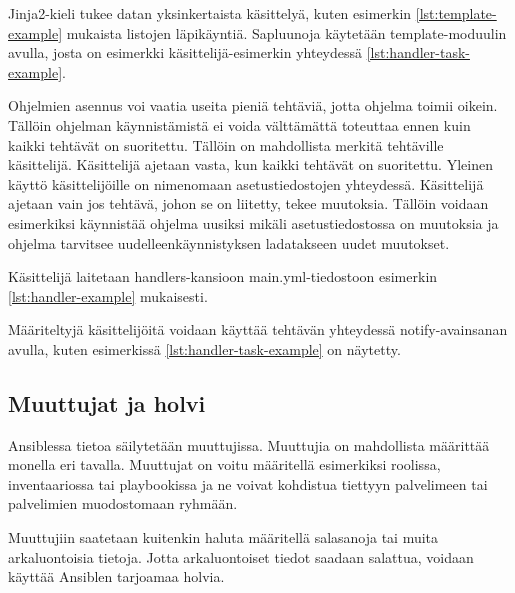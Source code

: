 

Jinja2-kieli tukee datan yksinkertaista käsittelyä, kuten esimerkin
\ref{lst:template-example} mukaista listojen läpikäyntiä. Sapluunoja
käytetään template-moduulin avulla, josta on esimerkki käsittelijä-esimerkin
yhteydessä \ref{lst:handler-task-example}. \parencite{AnsibleDocs}

Ohjelmien asennus voi vaatia useita pieniä tehtäviä, jotta ohjelma toimii
oikein. Tällöin ohjelman käynnistämistä ei voida välttämättä toteuttaa ennen
kuin kaikki tehtävät on suoritettu. Tällöin on mahdollista merkitä tehtäville
käsittelijä. Käsittelijä ajetaan vasta, kun kaikki tehtävät on suoritettu.
Yleinen käyttö käsittelijöille  on nimenomaan asetustiedostojen yhteydessä.
Käsittelijä ajetaan vain jos tehtävä, johon se on liitetty, tekee muutoksia.
Tällöin voidaan esimerkiksi käynnistää ohjelma uusiksi mikäli asetustiedostossa
on muutoksia ja ohjelma tarvitsee uudelleenkäynnistyksen ladatakseen uudet
muutokset. \parencite{JamesFreeman2020PA2}

Käsittelijä laitetaan handlers-kansioon main.yml-tiedostoon esimerkin
\ref{lst:handler-example} mukaisesti.



Määriteltyjä käsittelijöitä voidaan käyttää tehtävän yhteydessä notify-avainsanan
avulla, kuten esimerkissä \ref{lst:handler-task-example} on näytetty.



\subsection{Muuttujat ja holvi}

Ansiblessa tietoa säilytetään muuttujissa. Muuttujia on mahdollista määrittää monella
eri tavalla. Muuttujat on voitu määritellä esimerkiksi roolissa, inventaariossa
tai playbookissa ja ne voivat kohdistua tiettyyn palvelimeen tai palvelimien
muodostomaan ryhmään. \parencite{JamesFreeman2020PA2}

Muuttujiin saatetaan kuitenkin haluta määritellä salasanoja tai muita arkaluontoisia
tietoja. Jotta arkaluontoiset tiedot saadaan salattua, voidaan käyttää Ansiblen
tarjoamaa holvia. \parencite{JamesFreeman2020PA2}

